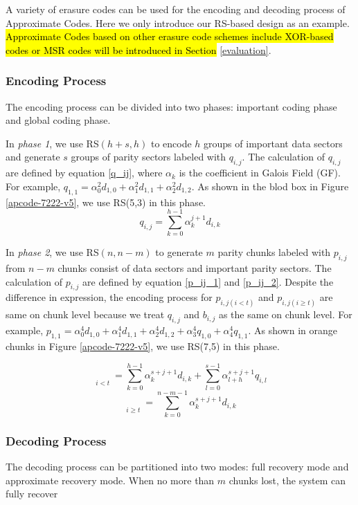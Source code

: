 \documentclass[sigconf]{acmart}
\begin{document}
A variety of erasure codes can be used for the encoding and decoding process of Approximate Codes. Here we only introduce our RS-based design as an example. 
\hl{Approximate Codes based on other erasure code schemes include XOR-based codes or MSR codes will be introduced in Section }\ref{evaluation}.

\subsubsection{Encoding Process}
The encoding process can be divided into two phases: important coding phase and global coding phase. 

In \emph{phase 1}, we use RS$(h+s,h)$ to encode $h$ groups of important data sectors and generate $s$ groups of parity sectors labeled with $q_{i,j}$. The calculation of $q_{i,j}$ are defined by equation \ref{q_ij}, where $\alpha_k$ is the coefficient in Galois Field (GF). 
For example, $q_{1,1} = \alpha_0^2 d_{1,0} + \alpha_1^2 d_{1,1} + \alpha_2^2 d_{1,2}$.
As shown in the blod box in Figure \ref{apcode-7222-v5}, we use RS(5,3) in this phase.
\begin{equation}\label{q_ij}
    q_{i,j} = \sum_{k=0}^{h-1} \alpha_k^{j+1} d_{i,k}
\end{equation}

In \emph{phase 2}, we use RS$(n,n-m)$ to generate $m$ parity chunks labeled with $p_{i,j}$ from $n-m$ chunks consist of data sectors and important parity sectors. The calculation of $p_{i,j}$ are defined by equation \ref{p_ij_1} and \ref{p_ij_2}.
Despite the difference in expression, the encoding process for $p_{i,j(i<t)}$ and $p_{i,j(i \geqslant t)}$ are same on chunk level because we treat $q_{i,j}$ and $b_{i,j}$ as the same on chunk level.
For example, $p_{1,1} = \alpha_0^4 d_{1,0} + \alpha_1^4 d_{1,1} + \alpha_2^4 d_{1,2} + \alpha_3^4 q_{1,0} + \alpha_4^4 q_{1,1}$.
As shown in orange chunks in Figure \ref{apcode-7222-v5}, we use RS(7,5) in this phase.

\begin{equation}\label{p_ij_1}
    \mathop{p_{i,j}}\limits_{i<t} = 
    \sum_{k=0}^{h-1} \alpha_k^{s+j+1} d_{i,k} +
    \sum_{l=0}^{s-1} \alpha_{l+h}^{s+j+1} q_{i,l}
\end{equation}
\begin{equation}\label{p_ij_2}
    \mathop{p_{i,j}}\limits_{i \geqslant t} = 
    \sum_{k=0}^{n-m-1} \alpha_k^{s+j+1} d_{i,k}
\end{equation}

\subsubsection{Decoding Process}
The decoding process can be partitioned into two modes: full recovery mode and approximate recovery mode. When no more than $m$ chunks lost, the system can fully recover 
\end{document}
